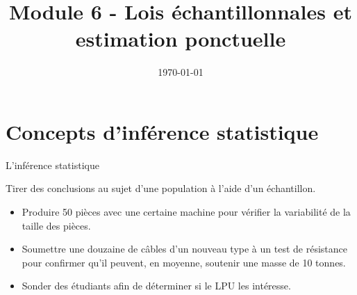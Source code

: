 \documentclass{BeamerTemplate}
\title{Module 6 - Lois échantillonnales et estimation ponctuelle}
\date{\today}
\begin{document}
\begin{frame}[t]
  \titlepage
\end{frame}








\section{Concepts d'inférence statistique}


\begin{frame}[t]{L'inférence statistique}

Tirer des conclusions au sujet d'une population à l'aide d'un échantillon.\\

\begin{itemize}\itemsep 5mm
\item<2-> Produire 50 pièces avec une certaine machine pour vérifier la variabilité de la taille des pièces.
\item<2-> Soumettre une douzaine de câbles d'un nouveau type à un test de résistance pour confirmer
qu'il peuvent, en moyenne, soutenir une masse de 10 tonnes.
\item<2-> Sonder des étudiants afin de déterminer si le LPU les intéresse.

\end{itemize}

\vfill
{}
\end{frame}



\end{document}
